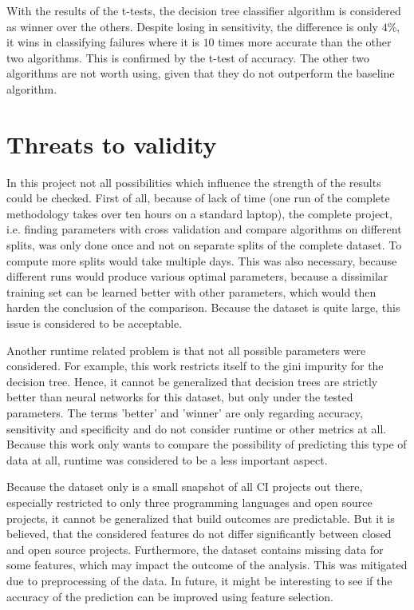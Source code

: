 \documentclass[a4paper,11pt]{article}
\begin{document}
With the results of the t-tests, the decision tree classifier algorithm is considered as winner over the others. Despite losing in sensitivity, the difference is only $4\%$, it wins in classifying failures where it is $10$ times more accurate than the other two algorithms. This is confirmed by the t-test of accuracy. The other two algorithms are not worth using, given that they do not outperform the baseline algorithm. 


\section{Threats to validity}

In this project not all possibilities which influence the strength of the results could be checked. 
First of all, because of lack of time (one run of the complete methodology takes over ten hours on a standard laptop), the complete project, i.e. finding parameters with cross validation and compare algorithms on different splits, was only done once and not on separate splits of the complete dataset. To compute more splits would take multiple days. 
This was also necessary, because different runs would produce various optimal parameters, because a dissimilar training set can be learned better with other parameters, which would then harden the conclusion of the comparison. Because the dataset is quite large, this issue is considered to be acceptable. 

Another runtime related problem is that not all possible parameters were considered. For example, this work restricts itself to the gini impurity for the decision tree. Hence, it cannot be generalized that decision trees are strictly better than neural networks for this dataset, but only under the tested parameters. The terms 'better' and 'winner' are only regarding accuracy, sensitivity and specificity and do not consider runtime or other metrics at all. Because this work only wants to compare the possibility of predicting this type of data at all, runtime was considered to be a less important aspect. 

Because the dataset only is a small snapshot of all CI projects out there, especially restricted to only three programming languages and open source projects, it cannot be generalized that build outcomes are predictable. But it is believed, that the considered features do not differ significantly between closed and open source projects. 
Furthermore, the dataset contains missing data for some features, which may impact the outcome of the analysis. This was mitigated due to preprocessing of the data. In future, it might be interesting to see if the accuracy of the prediction can be improved using feature selection. 
\end{document}

